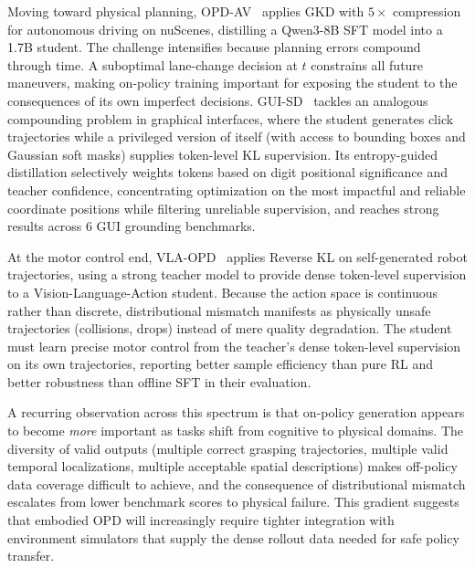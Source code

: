 \documentclass{article} %
\begin{document}
Moving toward physical planning, OPD-AV~\citep{2604.07944} applies GKD with $5\times$ compression for autonomous driving on nuScenes, distilling a Qwen3-8B SFT model into a 1.7B student. The challenge intensifies because planning errors compound through time. A suboptimal lane-change decision at $t$ constrains all future maneuvers, making on-policy training important for exposing the student to the consequences of its own imperfect decisions. GUI-SD~\citep{2605.00642} tackles an analogous compounding problem in graphical interfaces, where the student generates click trajectories while a privileged version of itself (with access to bounding boxes and Gaussian soft masks) supplies token-level KL supervision. Its entropy-guided distillation selectively weights tokens based on digit positional significance and teacher confidence, concentrating optimization on the most impactful and reliable coordinate positions while filtering unreliable supervision, and reaches strong results across 6 GUI grounding benchmarks.

At the motor control end, VLA-OPD~\citep{2603.26666} applies Reverse KL on self-generated robot trajectories, using a strong teacher model to provide dense token-level supervision to a Vision-Language-Action student. Because the action space is continuous rather than discrete, distributional mismatch manifests as physically unsafe trajectories (collisions, drops) instead of mere quality degradation. The student must learn precise motor control from the teacher's dense token-level supervision on its own trajectories, reporting better sample efficiency than pure RL and better robustness than offline SFT in their evaluation.

A recurring observation across this spectrum is that on-policy generation appears to become \emph{more} important as tasks shift from cognitive to physical domains. The diversity of valid outputs (multiple correct grasping trajectories, multiple valid temporal localizations, multiple acceptable spatial descriptions) makes off-policy data coverage difficult to achieve, and the consequence of distributional mismatch escalates from lower benchmark scores to physical failure. This gradient suggests that embodied OPD will increasingly require tighter integration with environment simulators that supply the dense rollout data needed for safe policy transfer.
\end{document}
